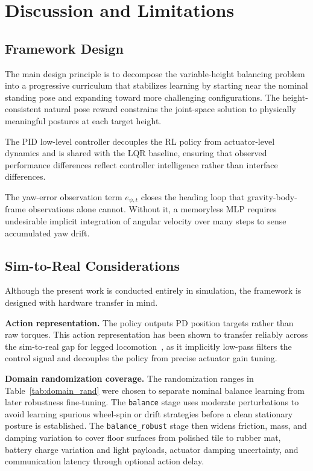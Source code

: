 \documentclass[conference]{IEEEtran}
\begin{document}
\section{Discussion and Limitations}
\label{sec:discussion}

\subsection{Framework Design}
The main design principle is to decompose the variable-height balancing
problem into a progressive curriculum that stabilizes learning by starting
near the nominal standing pose and expanding toward more challenging
configurations.
The height-consistent natural pose reward constrains the joint-space
solution to physically meaningful postures at each target height.

The PID low-level controller decouples the RL policy from actuator-level
dynamics and is shared with the LQR baseline, ensuring that observed
performance differences reflect controller intelligence rather than
interface differences.

The yaw-error observation term $e_{\psi,t}$ closes the heading loop
that gravity-body-frame observations alone cannot.
Without it, a memoryless MLP requires undesirable implicit integration of
angular velocity over many steps to sense accumulated yaw drift.

\subsection{Sim-to-Real Considerations}
\label{sec:sim2real}
Although the present work is conducted entirely in simulation,
the framework is designed with hardware transfer in mind.

\noindent\textbf{Action representation.}
The policy outputs PD position targets rather than raw torques.
This action representation has been shown to transfer reliably across
the sim-to-real gap for legged locomotion~\cite{hwangbo2019learning,rudin2022walk},
as it implicitly low-pass filters the control signal and decouples the policy
from precise actuator gain tuning.

\noindent\textbf{Domain randomization coverage.}
The randomization ranges in Table~\ref{tab:domain_rand} were chosen to
separate nominal balance learning from later robustness fine-tuning.
The \texttt{balance} stage uses moderate perturbations to avoid learning
spurious wheel-spin or drift strategies before a clean stationary posture is
established.
The \texttt{balance\_robust} stage then widens friction, mass, and damping
variation to cover floor surfaces from polished tile to rubber mat, battery
charge variation and light payloads, actuator damping uncertainty, and
communication latency through optional action delay.
\end{document}
